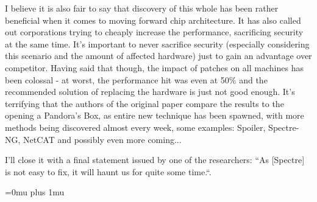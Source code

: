 \documentclass{article}
\begin{document}
I believe it is also fair to say that discovery of this whole has been rather beneficial when it comes to moving forward chip architecture. It has also called out corporations trying to cheaply increase the performance, sacrificing security at the same time. It's important to never sacrifice security (especially considering this scenario and the amount of affected hardware) just to gain an advantage over competitor. Having said that though, the impact of patches on all machines has been colossal - at worst, the performance hit was even at 50\% \cite{prout2018measuring} and the recommended solution of replacing the hardware is just not good enough. It's terrifying that the authors of the original paper compare the results to the opening a Pandora's Box, as entire new technique has been spawned, with more methods being discovered almost every week, some examples: Spoiler, Spectre-NG, NetCAT and possibly even more coming...

I'll close it with a final statement issued by one of the researchers: ``As [Spectre] is not easy to fix, it will haunt us for quite some time.``. 

\Urlmuskip=0mu plus 1mu\relax


 
\end{document}
